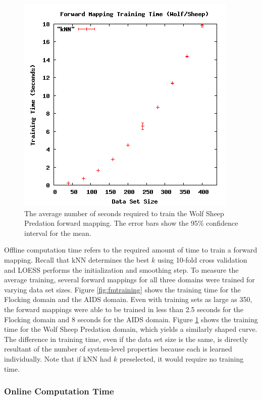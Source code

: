 \begin{figure}[ht]
\centering
\includegraphics[scale=.5]{images/results_wolfsheep/fm-training.png}
\caption{The average number of seconds required to train the Wolf Sheep Predation forward mapping.
The error bars show the 95\% confidence interval for the mean.}
\label{fig:wolfsheepfmtraining}
\end{figure}

Offline computation time refers to the required amount of time to train a forward mapping.
Recall that kNN determines the best $k$ using 10-fold cross validation and LOESS performs the initialization and smoothing step.
To measure the average training, several forward mappings for all three domains were trained for varying data set sizes.
Figure \ref{fig:fmtraining} shows the training time for the Flocking domain and the AIDS domain.
Even with training sets as large as 350, the forward mappings were able to be trained in less than 2.5 seconds for the Flocking domain and 8 seconds for the AIDS domain.
Figure \ref{fig:wolfsheepfmtraining} shows the training time for the Wolf Sheep Predation domain, which yields a similarly shaped curve.
The difference in training time, even if the data set size is the same, is directly resultant of the number of system-level properties because each is learned individually.
Note that if kNN had $k$ preselected, it would require no training time.



  \subsubsection{Online Computation Time}

